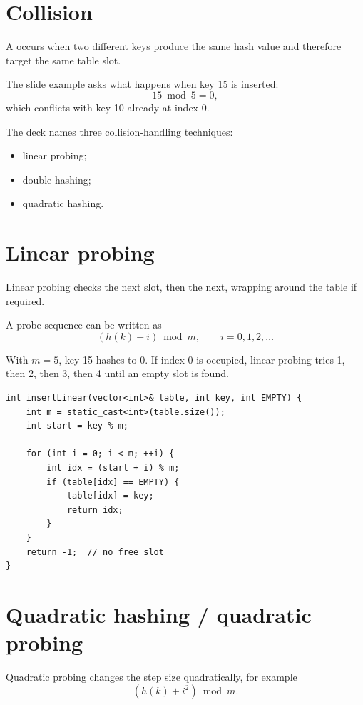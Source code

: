 \section{Collision}

A  occurs when two different keys produce the same hash value and therefore target the same table slot.

The slide example asks what happens when key 15 is inserted:
\[
15\bmod5=0,
\]
which conflicts with key 10 already at index 0.

The deck names three collision-handling techniques:

\begin{itemize}
  \item linear probing;
  \item double hashing;
  \item quadratic hashing.
\end{itemize}

\section{Linear probing}

Linear probing checks the next slot, then the next, wrapping around the table if required.

A probe sequence can be written as
\[
(h(k)+i)\bmod m,\qquad i=0,1,2,\dots
\]

\begin{workedexample}
With $m=5$, key 15 hashes to 0. If index 0 is occupied, linear probing tries 1, then 2, then 3, then 4 until an empty slot is found.
\end{workedexample}

\begin{lstlisting}
int insertLinear(vector<int>& table, int key, int EMPTY) {
    int m = static_cast<int>(table.size());
    int start = key % m;

    for (int i = 0; i < m; ++i) {
        int idx = (start + i) % m;
        if (table[idx] == EMPTY) {
            table[idx] = key;
            return idx;
        }
    }
    return -1;  // no free slot
}
\end{lstlisting}

\section{Quadratic hashing / quadratic probing}

Quadratic probing changes the step size quadratically, for example
\[
(h(k)+i^2)\bmod m.
\]


